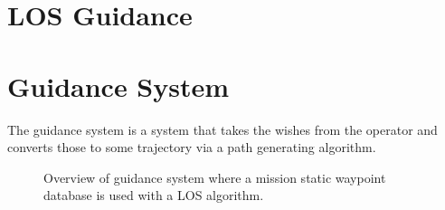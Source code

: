 \section{\acs{LOS} Guidance}

\section{Guidance System}
The guidance system is a system that takes the wishes from the
operator and converts those to some trajectory via a path generating
algorithm.


\begin{figure}[htbp]
	\centering
	
	\caption{Overview of guidance system where a mission static waypoint
	database is used with a \ac{LOS} algorithm.}
\end{figure}
